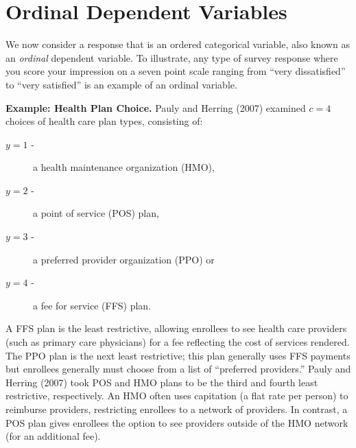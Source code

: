 \section{Ordinal Dependent Variables}

We now consider a response that is an ordered categorical variable,
also known as an \emph{ordinal} dependent variable. To illustrate,
any type of survey response where you score your impression on a
seven point scale ranging from ``very dissatisfied'' to ``very
satisfied'' is an example of an ordinal variable.

\linejed{}

\textbf{Example: Health Plan Choice.} Pauly and Herring (2007) examined $c=4$ choices of health
care plan types, consisting of:
\begin{description}
  \item [$y=1$ -] a health maintenance organization (HMO),
  \item [$y=2$ -] a point of service (POS) plan,
  \item [$y=3$ -] a preferred provider organization (PPO) or
  \item [$y=4$ -] a fee for service (FFS) plan.
\end{description}
A FFS plan is the least restrictive, allowing enrollees to see
health care providers (such as primary care physicians) for a fee
reflecting the cost of services rendered. The PPO plan is the next
least restrictive; this plan generally uses FFS payments but
enrollees generally must choose from a list of ``preferred
providers.'' Pauly and Herring (2007) took POS and HMO plans to be
the third and fourth least restrictive, respectively. An HMO often
uses capitation (a flat rate per person) to reimburse providers,
restricting enrollees to a network of providers. In contrast, a POS
plan gives enrollees the option to see providers outside of the HMO
network (for an additional fee).





